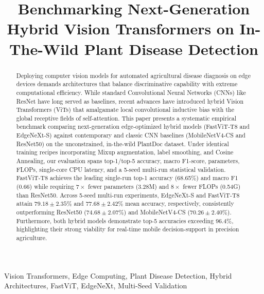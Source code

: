 \documentclass[conference]{IEEEtran}
\begin{document}
\title{Benchmarking Next-Generation Hybrid Vision Transformers on In-The-Wild Plant Disease Detection}

\author{
}

\maketitle

\begin{abstract}
Deploying computer vision models for automated agricultural disease diagnosis on edge devices demands architectures that balance discriminative capability with extreme computational efficiency. While standard Convolutional Neural Networks (CNNs) like ResNet have long served as baselines, recent advances have introduced hybrid Vision Transformers (ViTs) that amalgamate local convolutional inductive bias with the global receptive fields of self-attention. This paper presents a systematic empirical benchmark comparing next-generation edge-optimized hybrid models (FastViT-T8 and EdgeNeXt-S) against contemporary and classic CNN baselines (MobileNetV4-CS and ResNet50) on the unconstrained, in-the-wild PlantDoc dataset. Under identical training recipes incorporating Mixup augmentation, label smoothing, and Cosine Annealing, our evaluation spans top-1/top-5 accuracy, macro F1-score, parameters, FLOPs, single-core CPU latency, and a 5-seed multi-run statistical validation. FastViT-T8 achieves the leading single-run top-1 accuracy (68.65\%) and macro F1 (0.66) while requiring $7\times$ fewer parameters (3.28M) and $8\times$ fewer FLOPs (0.54G) than ResNet50. Across 5-seed multi-run experiments, EdgeNeXt-S and FastViT-T8 attain $79.18 \pm 2.35\%$ and $77.68 \pm 2.42\%$ mean accuracy, respectively, consistently outperforming ResNet50 ($74.68 \pm 2.07\%$) and MobileNetV4-CS ($70.26 \pm 2.40\%$). Furthermore, both hybrid models demonstrate top-5 accuracies exceeding 96.4\%, highlighting their strong viability for real-time mobile decision-support in precision agriculture.
\end{abstract}

\begin{IEEEkeywords}
Vision Transformers, Edge Computing, Plant Disease Detection, Hybrid Architectures, FastViT, EdgeNeXt, Multi-Seed Validation
\end{IEEEkeywords}
\end{document}
